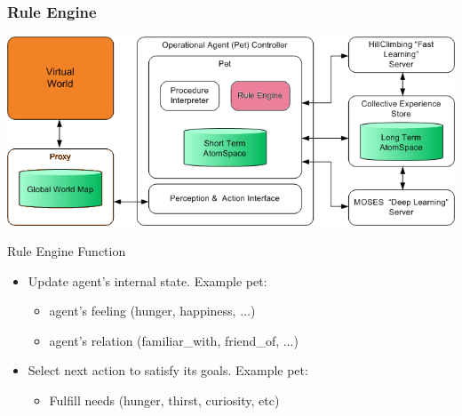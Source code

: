 \documentclass{beamer}
\begin{document}
\frame
{
  \frametitle{Rule Engine}

  \begin{center}
    \includegraphics[scale=0.3]{Embodiment_RuleEngine.png}
  \end{center}

  \begin{beamerboxesrounded}{Rule Engine Function}
    \begin{itemize}
    \item<+-> Update agent's internal state. Example pet:
      \begin{itemize}
      \item agent's feeling (hunger, happiness, $\ldots$)
      \item agent's relation (familiar\_with, friend\_of, $\ldots$)
      \end{itemize}
    \item<+-> Select next action to \alert{satisfy its goals}. Example pet:
      \begin{itemize}
      \item Fulfill needs (hunger, thirst, curiosity, etc)
      \end{itemize}
    \end{itemize}
  \end{beamerboxesrounded}
    
}
  
\end{document}
